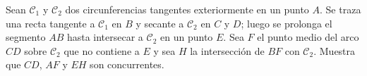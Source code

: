 Sean $\mathcal{C}_1$ y $\mathcal{C}_2$ dos circunferencias tangentes exteriormente en un punto $A$. Se traza una recta tangente a $\mathcal{C}_1$ en $B$ y secante a $\mathcal{C}_2$ en $C$ y $D$; luego se prolonga el segmento $AB$ hasta intersecar a $\mathcal{C}_2$ en un punto $E$. Sea $F$ el punto medio del arco $CD$ sobre $\mathcal{C}_2$ que no contiene a $E$ y sea $H$ la intersección de $BF$ con $\mathcal{C}_2$. Muestra que $CD$, $AF$ y $EH$ son concurrentes.